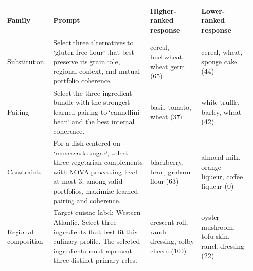 \begin{tabularx}{\linewidth}{@{}l X X X@{}}
\toprule
Family & Prompt & Higher-ranked response & Lower-ranked response \\
\midrule
Substitution & Select three alternatives to `gluten free flour` that best preserve its grain role, regional context, and mutual portfolio coherence. & cereal, buckwheat, wheat germ (65) & cereal, wheat, sponge cake (44) \\
Pairing & Select the three-ingredient bundle with the strongest learned pairing to `cannellini bean` and the best internal coherence. & basil, tomato, wheat (37) & white truffle, barley, wheat (42) \\
Constraints & For a dish centered on `muscovado sugar`, select three vegetarian complements with NOVA processing level at most 3; among valid portfolios, maximize learned pairing and coherence. & blackberry, bran, graham flour (63) & almond milk, orange liqueur, coffee liqueur (0) \\
Regional composition & Target cuisine label: Western Atlantic. Select three ingredients that best fit this culinary profile. The selected ingredients must represent three distinct primary roles. & crescent roll, ranch dressing, colby cheese (100) & oyster mushroom, tofu skin, ranch dressing (22) \\
\bottomrule
\end{tabularx}
